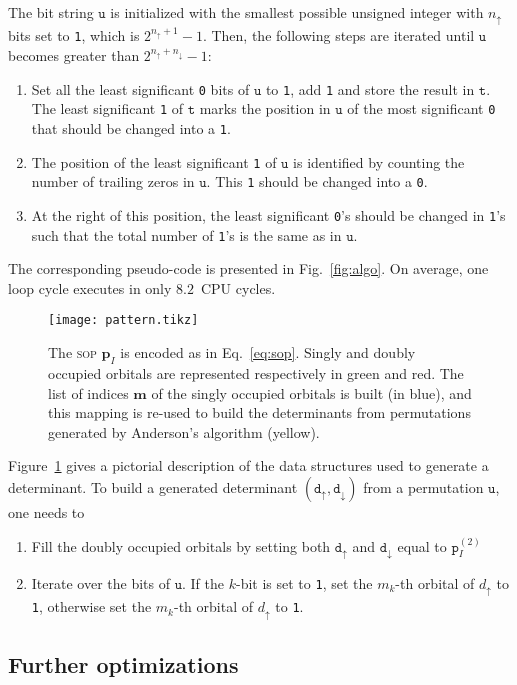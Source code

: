 \documentclass[aip,jcp,reprint,showkeys]{revtex4-1}
\newcommand{\tu}{\mathtt{u}}
\newcommand{\ttt}{\mathtt{t}}
\newcommand{\md}{\mathtt{d}}
\newcommand{\mpp}{\mathtt{p}}
\newcommand{\mpv}{\mathbf{p}}
\newcommand{\up}{\uparrow}
\newcommand{\dn}{\downarrow}
\newcommand{\one}{{\texttt{1}}}
\newcommand{\zero}{{\texttt{0}}}
\newcommand{\sop}{\textsc{sop}}
\begin{document}
The bit string $\tu$ is initialized with the smallest possible unsigned integer with
$n_\up$ bits set to \one, which is $2^{n_\up+1}-1$. Then, the
following steps are iterated until $\tu$ becomes greater than $2^{n_\up+n_\dn}-1$:
\begin{enumerate}
    \item Set all the least significant \zero{} bits of $\tu$ to \one{}, add \one{} and store the result in $\ttt$. The least significant \one{} of $\ttt$ marks the position in $\tu$ of the most significant \zero{} that should be changed into a \one{}.
    \item The position of the least significant \one{} of $\tu$ is identified by counting the number of trailing zeros in $\tu$. This \one{} should be changed into a \zero{}.
    \item At the right of this position, the least significant \zero's should be changed in \one's such that the total number of \one's is the same as in $\tu$.
\end{enumerate}
The corresponding pseudo-code is presented in Fig.~\ref{fig:algo}. On average, one loop cycle executes in only $8.2$~CPU cycles.

\begin{figure}[t]
\texttt{[image: pattern.tikz]} 
\caption{The {\sop} $\mpv_I$ is encoded as in Eq.~\eqref{eq:sop}. Singly and doubly
occupied orbitals are represented respectively in green and red.
The list of indices $\mathbf{m}$ of the singly occupied orbitals is built (in blue), and this
mapping is re-used to build the determinants from permutations generated by Anderson's algorithm (yellow).}
\label{fig:mapping}
\end{figure}

Figure~\ref{fig:mapping} gives a pictorial description of the data structures used to generate a determinant.
To build a generated determinant $(\md_\up,\md_\dn)$ from a permutation $\tu$, one needs to
\begin{enumerate}
    \item Fill the doubly occupied orbitals by setting both $\md_\up$ and $\md_\dn$
          equal to $\mpp_I^{(2)}$
    \item Iterate over the bits of $\tu$. If the $k$-bit is set to \one{}, set the $m_k$-th orbital of $d_\up$ to \one, otherwise set the $m_k$-th orbital of $d_\up$ to \one.
\end{enumerate}

\subsection{Further optimizations}
\end{document}
